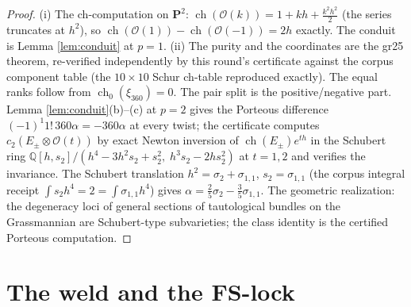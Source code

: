 \documentclass[11pt]{article}
\newcommand{\Oo}{\mathcal O}
\newcommand{\ch}{\operatorname{ch}}
\newcommand{\Q}{\mathbb Q}
\begin{document}
\begin{proof}
(i) The ch-computation on $\mathbf P^2$:
$\ch(\Oo(k))=1+kh+\tfrac{k^2h^2}{2}$ (the series truncates at $h^2$),
so $\ch(\Oo(1))-\ch(\Oo(-1))=2h$ exactly. The conduit is Lemma
\ref{lem:conduit} at $p=1$. (ii) The purity and the coordinates are
the gr25 theorem, re-verified independently by this round's
certificate against the corpus component table (the $10\times10$
Schur ch-table reproduced exactly). The equal ranks follow from
$\ch_0(\xi_{360})=0$. The pair split is the positive/negative part.
Lemma \ref{lem:conduit}(b)--(c) at $p=2$ gives the Porteous
difference $(-1)^{1}1!\,360\alpha=-360\alpha$ at every twist; the
certificate computes $c_2(E_\pm\otimes\Oo(t))$ by exact Newton
inversion of $\ch(E_\pm)e^{th}$ in the Schubert ring
$\Q[h,s_2]/(h^4-3h^2s_2+s_2^2,\;h^3s_2-2hs_2^2)$ at $t=1,2$ and
verifies the invariance. The Schubert translation
$h^2=\sigma_2+\sigma_{1,1}$, $s_2=\sigma_{1,1}$ (the corpus integral
receipt $\int s_2h^4=2=\int\sigma_{1,1}h^4$) gives
$\alpha=\tfrac25\sigma_2-\tfrac35\sigma_{1,1}$. The geometric
realization: the degeneracy loci of general sections of tautological
bundles on the Grassmannian are Schubert-type subvarieties; the class
identity is the certified Porteous computation.
\end{proof}

\section{The weld and the FS-lock}
\end{document}
